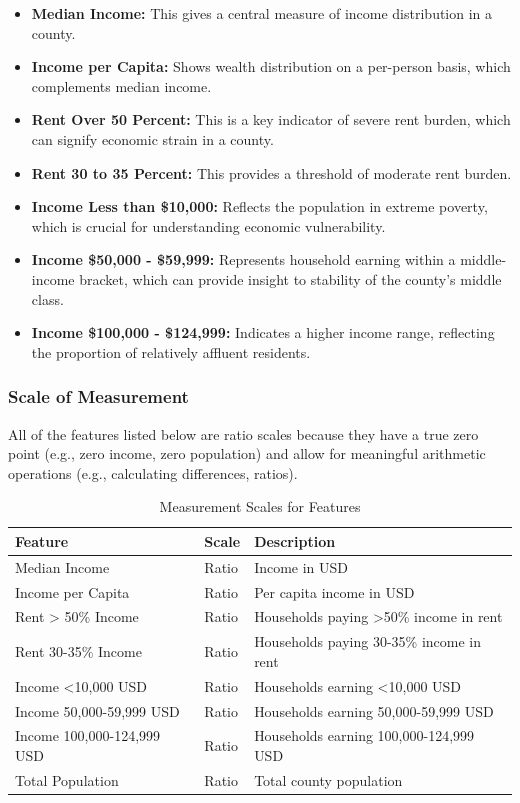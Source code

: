\documentclass[
]{article}
\providecommand{\tightlist}{%
  \setlength{\itemsep}{0pt}\setlength{\parskip}{0pt}}
\begin{document}
\begin{itemize}
\tightlist
\item
  \textbf{Median Income:} This gives a central measure of income
  distribution in a county.
\item
  \textbf{Income per Capita:} Shows wealth distribution on a per-person
  basis, which complements median income.
\item
  \textbf{Rent Over 50 Percent:} This is a key indicator of severe rent
  burden, which can signify economic strain in a county.
\item
  \textbf{Rent 30 to 35 Percent:} This provides a threshold of moderate
  rent burden.
\item
  \textbf{Income Less than \$10,000:} Reflects the population in extreme
  poverty, which is crucial for understanding economic vulnerability.
\item
  \textbf{Income \$50,000 - \$59,999:} Represents household earning
  within a middle-income bracket, which can provide insight to stability
  of the county's middle class.
\item
  \textbf{Income \$100,000 - \$124,999:} Indicates a higher income
  range, reflecting the proportion of relatively affluent residents.
\end{itemize}

\subsubsection{Scale of Measurement}\label{scale-of-measurement}

All of the features listed below are ratio scales because they have a
true zero point (e.g., zero income, zero population) and allow for
meaningful arithmetic operations (e.g., calculating differences,
ratios).

\begingroup\fontsize{10}{12}\selectfont

\begin{longtable}[t]{lll}
\caption{\label{tab:scale of measurement}Measurement Scales for Features}\\
\toprule
Feature & Scale & Description\\
\midrule
Median Income & Ratio & Income in USD\\
Income per Capita & Ratio & Per capita income in USD\\
Rent > 50\% Income & Ratio & Households paying >50\% income in rent\\
Rent 30-35\% Income & Ratio & Households paying 30-35\% income in rent\\
Income <10,000 USD & Ratio & Households earning <10,000 USD\\
\addlinespace
Income 50,000-59,999 USD & Ratio & Households earning 50,000-59,999 USD\\
Income 100,000-124,999 USD & Ratio & Households earning 100,000-124,999 USD\\
Total Population & Ratio & Total county population\\
\bottomrule
\end{longtable}
\endgroup{}
\end{document}
